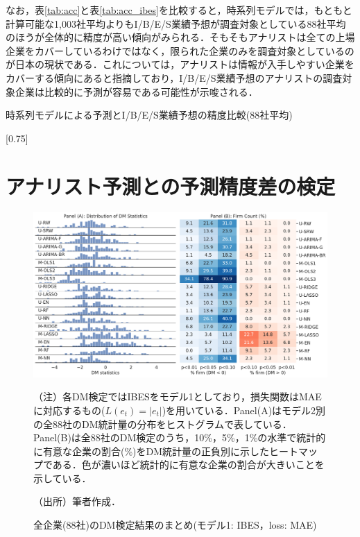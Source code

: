 \documentclass[a4paper，11pt]{jsarticle}
\begin{document}
なお，表\ref{tab:acc}と表\ref{tab:acc_ibes}を比較すると，時系列モデルでは，もともと計算可能な1,003社平均よりもI/B/E/S業績予想が調査対象としている88社平均のほうが全体的に精度が高い傾向がみられる．そもそもアナリストは全ての上場企業をカバーしているわけではなく，限られた企業のみを調査対象としているのが日本の現状である．これについて\cite{nakai2006}は，アナリストは情報が入手しやすい企業をカバーする傾向にあると指摘しており，I/B/E/S業績予想のアナリストの調査対象企業は比較的に予測が容易である可能性が示唆される．

\begin{landscape}
  \begin{table}[p]
      \caption{時系列モデルによる予測とI/B/E/S業績予想の精度比較(88社平均)}
      \label{tab:acc_ibes}
      \scalebox{0.75}[0.75]{
        
      }
  \end{table}
  \end{landscape}

\section{アナリスト予測との予測精度差の検定}

\begin{figure}[bp]
  \centering
  \caption{全企業(88社)のDM検定結果のまとめ(モデル1: IBES，loss: MAE)}
  \label{fig:dm_ibes_mad}
  \includegraphics[width=\linewidth]{./img/_dm_MAD_y_hat_ibes.pdf}
  \begin{threeparttable}
  \begin{tablenotes}
    \item[]（注）各DM検定ではIBESをモデル1としており，損失関数はMAEに対応するもの($L(e_t)=|e_t|$)を用いている．Panel(A)はモデル2別の全88社のDM統計量の分布をヒストグラムで表している．Panel(B)は全88社のDM検定のうち，10\%，5\%，1\%の水準で統計的に有意な企業の割合(\%)をDM統計量の正負別に示したヒートマップである．色が濃いほど統計的に有意な企業の割合が大きいことを示している．
    \item[]（出所）筆者作成．
  \end{tablenotes}
  \end{threeparttable}
\end{figure}
\end{document}
